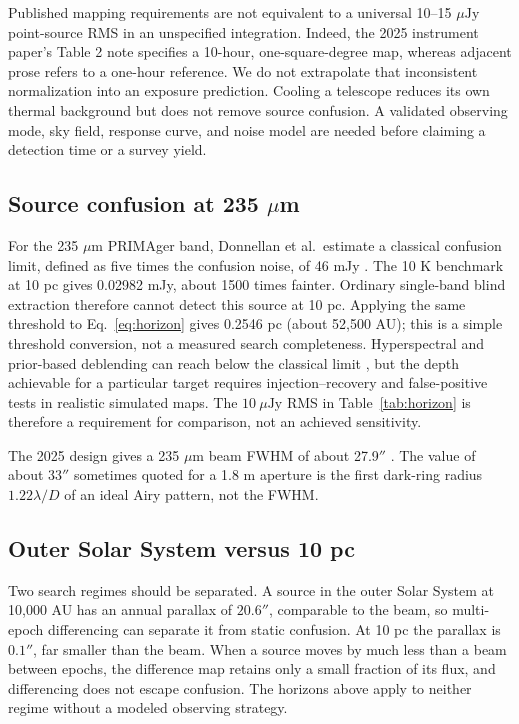 \documentclass[10pt,twocolumn]{article}
\newcommand{\ujy}{\mu\mathrm{Jy}}
\begin{document}
Published mapping requirements are not equivalent to a universal
10--15 $\ujy$ point-source RMS in an unspecified integration. Indeed,
the 2025 instrument paper's Table 2 note specifies a 10-hour,
one-square-degree map, whereas adjacent prose refers to a one-hour
reference. We do not extrapolate that inconsistent normalization into
an exposure prediction. Cooling a telescope reduces its own thermal
background but does not remove source confusion. A validated observing
mode, sky field, response curve, and noise model are needed before
claiming a detection time or a survey yield.

\subsection{Source confusion at 235 $\mu$m}
For the 235 $\mu$m PRIMAger band, Donnellan et al.\ estimate a classical
confusion limit, defined as five times the confusion noise, of 46 mJy
\cite{Donnellan2024}. The 10 K benchmark at 10 pc gives 0.02982 mJy,
about 1500 times fainter. Ordinary single-band blind extraction
therefore cannot detect this source at 10 pc. Applying the same
threshold to Eq.~\ref{eq:horizon} gives 0.2546 pc (about
52,500 AU); this is a simple threshold conversion, not a measured
search completeness. Hyperspectral and prior-based deblending can reach
below the classical limit \cite{Donnellan2024}, but the depth achievable
for a particular target requires injection--recovery and false-positive
tests in realistic simulated maps. The $10\ \ujy$ RMS in
Table~\ref{tab:horizon} is therefore a requirement for comparison, not
an achieved sensitivity.

The 2025 design gives a 235 $\mu$m beam FWHM of about 27.9$''$
\cite{Ciesla2025}. The value of about 33$''$ sometimes quoted for a
1.8 m aperture is the first dark-ring radius $1.22\lambda/D$ of an ideal
Airy pattern, not the FWHM.

\subsection{Outer Solar System versus 10 pc}
Two search regimes should be separated. A source in the outer Solar
System at 10,000 AU has an annual parallax of $20.6''$, comparable to
the beam, so multi-epoch differencing can separate it from static
confusion. At 10 pc the parallax is $0.1''$, far smaller than the beam.
When a source moves by much less than a beam between epochs, the
difference map retains only a small fraction of its flux, and
differencing does not escape confusion. The horizons above apply to
neither regime without a modeled observing strategy.
\end{document}
